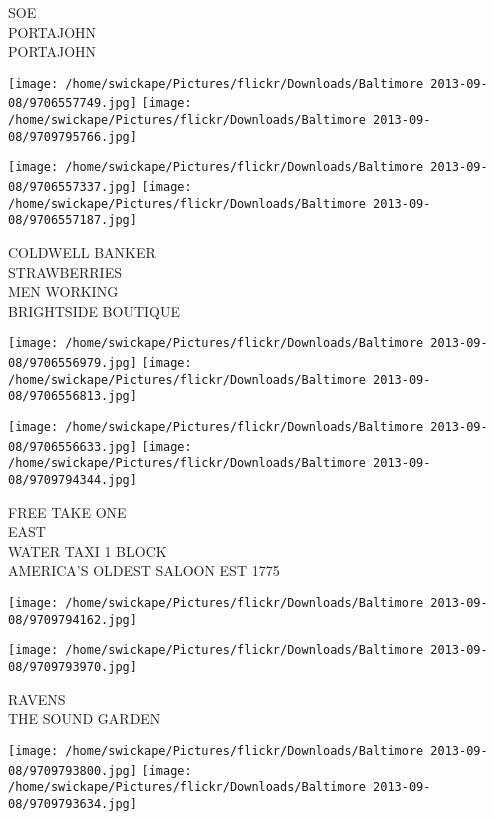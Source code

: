 \documentclass[10pt,letterpaper]{article}
\begin{document}
SOE\\
PORTAJOHN\\
PORTAJOHN\\
\pagebreak

\texttt{[image: /home/swickape/Pictures/flickr/Downloads/Baltimore 2013-09-08/9706557749.jpg]}
\texttt{[image: /home/swickape/Pictures/flickr/Downloads/Baltimore 2013-09-08/9709795766.jpg]}

\texttt{[image: /home/swickape/Pictures/flickr/Downloads/Baltimore 2013-09-08/9706557337.jpg]}
\texttt{[image: /home/swickape/Pictures/flickr/Downloads/Baltimore 2013-09-08/9706557187.jpg]}

COLDWELL BANKER\\
STRAWBERRIES\\
MEN WORKING\\
BRIGHTSIDE BOUTIQUE\\
\pagebreak

\texttt{[image: /home/swickape/Pictures/flickr/Downloads/Baltimore 2013-09-08/9706556979.jpg]}
\texttt{[image: /home/swickape/Pictures/flickr/Downloads/Baltimore 2013-09-08/9706556813.jpg]}

\texttt{[image: /home/swickape/Pictures/flickr/Downloads/Baltimore 2013-09-08/9706556633.jpg]}
\texttt{[image: /home/swickape/Pictures/flickr/Downloads/Baltimore 2013-09-08/9709794344.jpg]}

FREE TAKE ONE\\
EAST\\
WATER TAXI 1 BLOCK\\
AMERICA'S OLDEST SALOON EST 1775\\
\pagebreak

\texttt{[image: /home/swickape/Pictures/flickr/Downloads/Baltimore 2013-09-08/9709794162.jpg]}

\vspace{0.25in}
\texttt{[image: /home/swickape/Pictures/flickr/Downloads/Baltimore 2013-09-08/9709793970.jpg]}

RAVENS\\
THE SOUND GARDEN\\
\pagebreak

\texttt{[image: /home/swickape/Pictures/flickr/Downloads/Baltimore 2013-09-08/9709793800.jpg]}
\texttt{[image: /home/swickape/Pictures/flickr/Downloads/Baltimore 2013-09-08/9709793634.jpg]}
\end{document}
